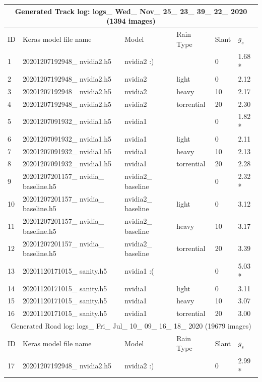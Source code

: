 \begin{table}[]
\begin{center}
\begin{tabular}{|l|l|l|l|l|l|}
\multicolumn{6}{|c|}{Generated Track log: logs\_ Wed\_ Nov\_ 25\_ 23\_ 39\_ 22\_ 2020 (1394 images)} \\ \hline
ID & Keras model file name & Model & Rain Type & Slant & $g_s$ \\ \hline
1 & 20201207192948\_ nvidia2.h5 & nvidia2 :) &  & 0 & 1.68 * \\ \hline
2 & 20201207192948\_ nvidia2.h5 & nvidia2 & light & 0 & 2.12 \\ \hline
3 & 20201207192948\_ nvidia2.h5 & nvidia2 & heavy & 10 & 2.17 \\ \hline
4 & 20201207192948\_ nvidia2.h5 & nvidia2 & torrential & 20 & 2.30 \\ \hline
5 & 20201207091932\_ nvidia1.h5 & nvidia1 &  & 0 & 1.82 * \\ \hline
6 & 20201207091932\_ nvidia1.h5 & nvidia1 & light & 0 & 2.11 \\ \hline
7 & 20201207091932\_ nvidia1.h5 & nvidia1 & heavy & 10 & 2.13 \\ \hline
8 & 20201207091932\_ nvidia1.h5 & nvidia1 & torrential & 20 & 2.28 \\ \hline
9 & 20201207201157\_ nvidia\_ baseline.h5 & nvidia2\_ baseline &  & 0 & 2.32 * \\ \hline
10 & 20201207201157\_ nvidia\_ baseline.h5 & nvidia2\_ baseline & light & 0 & 3.12 \\ \hline
11 & 20201207201157\_ nvidia\_ baseline.h5 & nvidia2\_ baseline & heavy & 10 & 3.17 \\ \hline
12 & 20201207201157\_ nvidia\_ baseline.h5 & nvidia2\_ baseline & torrential & 20 & 3.39 \\ \hline
13 & 20201120171015\_ sanity.h5 & nvidia1 :( &  & 0 & 5.03 * \\ \hline
14 & 20201120171015\_ sanity.h5 & nvidia1 & light & 0 & 3.11 \\ \hline
15 & 20201120171015\_ sanity.h5 & nvidia1 & heavy & 10 & 3.07 \\ \hline
16 & 20201120171015\_ sanity.h5 & nvidia1 & torrential & 20 & 3.00 \\ \hline
\multicolumn{6}{|c|}{Generated Road log:  logs\_ Fri\_ Jul\_ 10\_ 09\_ 16\_ 18\_ 2020 (19679 images)} \\ \hline
ID & Keras model file name & Model & Rain Type & Slant & $g_s$ \\ \hline
17 & 20201207192948\_ nvidia2.h5 & nvidia2 :) &  & 0 & 2.99 * \\ \hline  %

\end{tabular}
\end{center}
\end{table}
